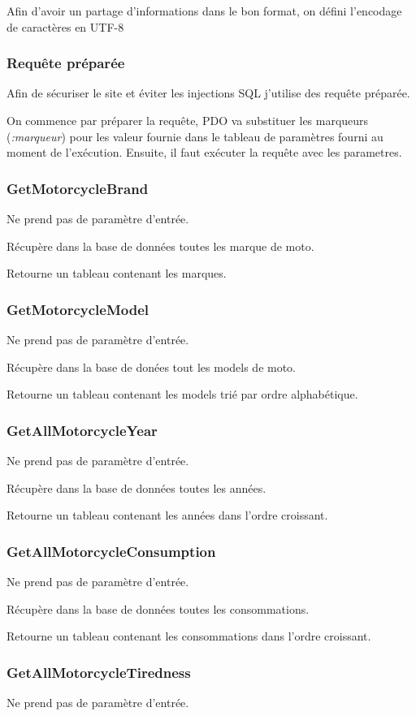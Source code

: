 \documentclass[a4paper]{article}
\begin{document}
Afin d'avoir un partage d'informations dans le bon format, on défini l'encodage de caractères en UTF-8

\subsubsection{Requête préparée}
Afin de sécuriser le site et éviter les injections SQL j'utilise des requête préparée.

On commence par préparer la requête, PDO va substituer les marqueurs (\emph{:marqueur}) pour les valeur fournie dans le tableau de paramètres fourni au moment de l'exécution. Ensuite, il faut exécuter la requête avec les parametres.

\subsubsection{GetMotorcycleBrand}
Ne prend pas de paramètre d'entrée.

Récupère dans la base de données toutes les marque de moto.

Retourne un tableau contenant les marques.
\subsubsection{GetMotorcycleModel}
Ne prend pas de paramètre d'entrée.

Récupère dans la base de donées tout les models de moto.

Retourne un tableau contenant les models trié par ordre alphabétique.
\subsubsection{GetAllMotorcycleYear}
Ne prend pas de paramètre d'entrée.

Récupère dans la base de données toutes les années.

Retourne un tableau contenant les années dans l'ordre croissant.
\subsubsection{GetAllMotorcycleConsumption}
Ne prend pas de paramètre d'entrée.

Récupère dans la base de données toutes les consommations.

Retourne un tableau contenant les consommations dans l'ordre croissant.
\subsubsection{GetAllMotorcycleTiredness}
Ne prend pas de paramètre d'entrée.
\end{document}
